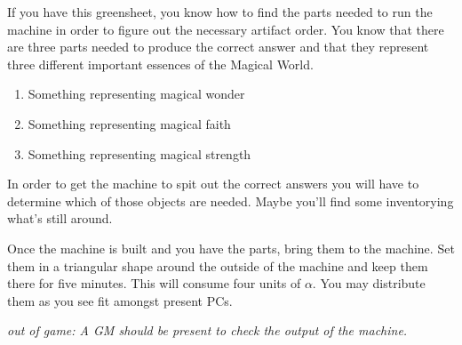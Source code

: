 \documentclass[green]{guildcamp3}
\begin{document}
\name{\gAddPartsMagic{}}


If you have this greensheet, you know how to find the parts needed to run the machine in order to figure out the necessary artifact order. You know that there are three parts needed to produce the correct answer and that they represent three different important essences of the Magical World.

\begin{enumerate}
	\item Something representing magical wonder
	\item Something representing magical faith
	\item Something representing magical strength
\end{enumerate}

In order to get the machine to spit out the correct answers you will have to determine which of those objects are needed. Maybe you'll find some inventorying what's still around. 

Once the machine is built and you have the parts, bring them to the machine. Set them in a triangular shape around the outside of the machine and keep them there for five minutes. This will consume four units of $\alpha$. You may distribute them as you see fit amongst present PCs.

\emph{out of game: A GM should be present to check the output of the machine.}

\end{document}
